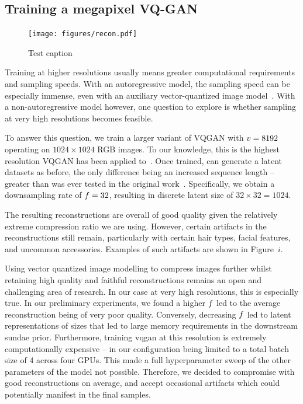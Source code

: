 \subsection{Training a megapixel VQ-GAN}
\label{sec:megagan}

\begin{figure}[ht]
    \centering
    \texttt{[image: figures/recon.pdf]}
    \caption{Test caption}
\end{figure}

Training at higher resolutions usually means greater computational requirements
and sampling speeds. With an autoregressive model, the sampling speed can be
especially immense, even with an auxiliary vector-quantized image
model~\cite{esser2021taming}. With a non-autoregressive model however, one
question to explore is whether sampling at very high resolutions becomes
feasible.

To answer this question, we train a larger variant of VQGAN with
$v = 8192$ operating on $1024 \times 1024$ RGB images. To our
knowledge, this is the highest resolution VQGAN has been applied
to~\cite{esser2021taming}. Once trained, can generate a latent datasets as
before, the only difference being an increased sequence length -- greater than
was ever tested in the original work~\cite{savinov2022stepunrolled}.
Specifically, we obtain a downsampling rate of $f=32$, resulting
in discrete latent size of $32 \times 32 = 1024$.

The resulting reconstructions are overall of good quality given the relatively
extreme compression ratio we are using. However, certain artifacts in the
reconstructions still remain, particularly with certain hair types, facial
features, and uncommon accessories. Examples of such artifacts are shown in
Figure~$i$.

Using vector quantized image modelling to compress images further whilst
retaining high quality and faithful reconstructions remains an open and
challenging area of research. In our case at very high resolutions, this is
especially true. In our preliminary experiments, we found a higher
$f$ led to the average reconstruction being of very poor quality.
Conversely, decreasing $f$ led to latent representations of sizes
that led to large memory requirements in the downstream \gls{sundae} prior.
Furthermore, training \gls{vqgan} at this resolution is extremely
computationally expensive -- in our configuration being limited to a total batch
size of 4 across four GPUs. This made a full hyperparameter sweep of the other
parameters of the model not possible. Therefore, we decided to compromise with
good reconstructions on average, and accept occasional artifacts which could 
potentially manifest in the final samples.

